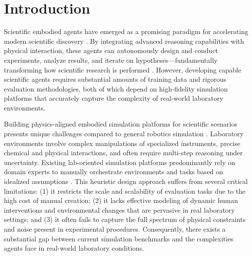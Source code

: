 \documentclass[letterpaper]{article} %
\begin{document}

\section{Introduction}

Scientific embodied agents have emerged as a promising paradigm for accelerating modern scientific discovery \cite{drori2023ai, segler2018planning}. By integrating advanced reasoning capabilities with physical interaction, these agents can autonomously design and conduct experiments, analyze results, and iterate on hypotheses---fundamentally transforming how scientific research is performed \cite{king2009automating, scanlon2017scientific}. However, developing capable scientific agents requires substantial amounts of training data and rigorous evaluation methodologies, both of which depend on high-fidelity simulation platforms that accurately capture the complexity of real-world laboratory environments.

Building physics-aligned embodied simulation platforms for scientific scenarios presents unique challenges compared to general robotics simulation \cite{zhu2023mujoco, teng2021isaac}. Laboratory environments involve complex manipulations of specialized instruments, precise chemical and physical interactions, and often require multi-step reasoning under uncertainty. Existing lab-oriented simulation platforms predominantly rely on domain experts to manually orchestrate environments and tasks based on idealized assumptions \cite{bohg2023perspective}. This heuristic design approach suffers from several critical limitations: (1) it restricts the scale and scalability of evaluation tasks due to the high cost of manual creation; (2) it lacks effective modeling of dynamic human interventions and environmental changes that are pervasive in real laboratory settings; and (3) it often fails to capture the full spectrum of physical constraints and noise present in experimental procedures. Consequently, there exists a substantial gap between current simulation benchmarks and the complexities agents face in real-world laboratory conditions.
\end{document}
